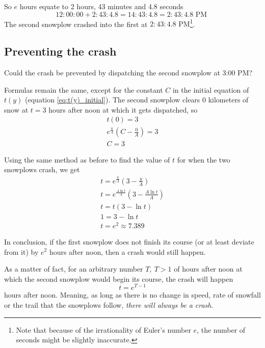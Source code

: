\documentclass[a4paper,12pt]{article}
\renewcommand*{\textnormal}[1]{\text{ #1 }}
\begin{document}
        So \(e\) hours equate to 2 hours, 43 minutes and 4.8 seconds
        \[
            12{:}00{:}00 + 2{:}43{:}4.8 = 14{:}43{:}4.8 = 2{:}43{:}4.8 \textnormal{PM}
        \]
        The second snowplow crashed into the first at \(2{:}43{:}4.8 \text{ PM}\)\footnote{Note that because of the irrationality of Euler's number \(e\), the number of seconds might be slightly inaccurate.}.
        
    \subsection{Preventing the crash}
        Could the crash be prevented by dispatching the second snowplow at 3:00 PM?

        \hfill \break
        Formulas remain the same, except for the constant \(C\) in the initial equation of \(t(y)\) (equation \eqref{eq:t(y)_initial}).
        The second snowplow clears \(0\) kilometers of snow at \(t = 3\) hours after noon at which it gets dispatched, so
        \begin{gather*}
            t(0) = 3 \\
            e^{\frac{0}{A}}\left(C - \frac{0}{A}\right) = 3 \\
            C = 3
        \end{gather*}

        Using the same method as before to find the value of \(t\) for when the two snowplows crash, we get
        \begin{gather*}
            t = e^{\frac{y}{A}}\left(3-\frac{y}{A}\right) \\
            t = e^\frac{A \ln t}{A}\left(3 - \frac{A \ln t}{A}\right) \\
            t = t(3 - \ln t) \\
            1 = 3 - \ln t \\
            t = e^2 \approx 7.389
        \end{gather*}

        In conclusion, if the first snowplow does not finish its course (or at least deviate from it) by $e^2$ hours after noon, then a crash would still happen.

        \hfill \break
        As a matter of fact, for an arbitrary number $T, \ T > 1$ of hours after noon at which the second snowplow would begin its course, the crash will happen
        \[ t = e^{T-1} \]
        hours after noon. Meaning, as long as there is no change in speed, rate of snowfall or the trail that the snowplows follow, \emph{there will always be a crash}.
    

\newpage \printbibliography
\end{document}
